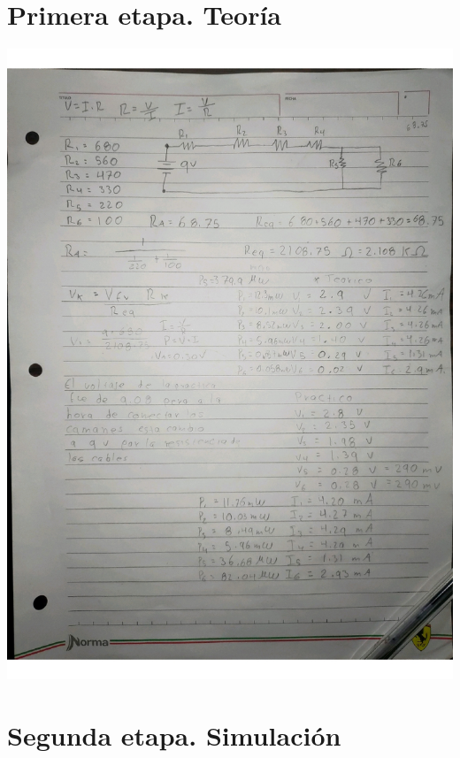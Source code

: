 \documentclass[10pt]{article}
\begin{document}
\begin{multicols}{2}
\section{Primera etapa. Teoría}
\includegraphics[width=\linewidth]{Imagenes/notas.jpg}
\section{Segunda etapa. Simulación}

\end{multicols}
\end{document}
